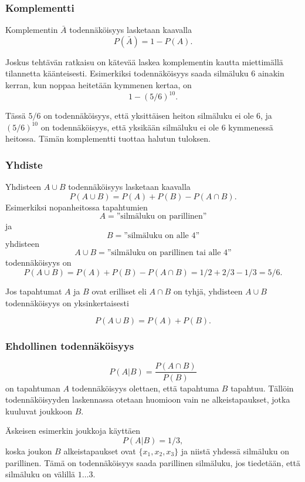 \subsubsection{Komplementti}

Komplementin $\bar A$
todennäköisyys lasketaan kaavalla
\[P(\bar A)=1-P(A).\]

Joskus tehtävän ratkaisu on kätevää
laskea komplementin kautta
miettimällä tilannetta käänteisesti.
Esimerkiksi todennäköisyys saada
silmäluku 6 ainakin kerran,
kun noppaa heitetään kymmenen kertaa, on
\[1-(5/6)^{10}.\]

Tässä $5/6$ on todennäköisyys,
että yksittäisen heiton silmäluku ei ole 6,
ja $(5/6)^{10}$ on todennäköisyys, että yksikään
silmäluku ei ole 6 kymmenessä heitossa.
Tämän komplementti tuottaa halutun tuloksen.

\subsubsection{Yhdiste}

Yhdisteen $A \cup B$ todennäköisyys lasketaan kaavalla 
\[P(A \cup B)=P(A)+P(B)-P(A \cap B).\]
Esimerkiksi nopanheitossa tapahtumien
\[A=\textrm{''silmäluku on parillinen''}\]
ja
\[B=\textrm{''silmäluku on alle 4''}\]
yhdisteen
\[A \cup B=\textrm{''silmäluku on parillinen tai alle 4''}\]
todennäköisyys on
\[P(A \cup B) = P(A)+P(B)-P(A \cap B)=1/2+2/3-1/3=5/6.\]

Jos tapahtumat $A$ ja $B$ ovat erilliset eli $A \cap B$ on tyhjä,
yhdisteen $A \cup B$ todennäköisyys on yksinkertaisesti

\[P(A \cup B)=P(A)+P(B).\]

\subsubsection{Ehdollinen todennäköisyys}


\[P(A | B) = \frac{P(A \cap B)}{P(B)}\]
on tapahtuman $A$ todennäköisyys
olettaen, että tapahtuma $B$ tapahtuu.
Tällöin todennäköisyyden laskennassa otetaan
huomioon vain ne alkeistapaukset,
jotka kuuluvat joukkoon $B$.

Äskeisen esimerkin joukkoja käyttäen
\[P(A | B)= 1/3,\]
koska joukon $B$ alkeistapaukset ovat
$\{x_1,x_2,x_3\}$ ja niistä yhdessä
silmäluku on parillinen.
Tämä on todennäköisyys saada parillinen silmäluku,
jos tiedetään, että silmäluku on välillä $1 \ldots 3$.

